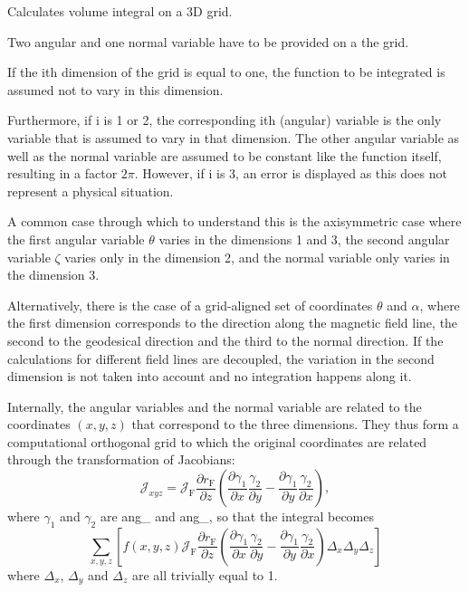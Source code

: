 Calculates volume integral on a 3D grid. 

Two angular and one normal variable have to be provided on a the grid.

If the {\ttfamily i}\textquotesingle{}th dimension of the grid is equal to one, the function to be integrated is assumed not to vary in this dimension.

Furthermore, if {\ttfamily i} is 1 or 2, the corresponding {\ttfamily i}\textquotesingle{}th (angular) variable is the only variable that is assumed to vary in that dimension. The other angular variable as well as the normal variable are assumed to be constant like the function itself, resulting in a factor $2 \pi$. However, if {\ttfamily i} is 3, an error is displayed as this does not represent a physical situation.

A common case through which to understand this is the axisymmetric case where the first angular variable $\theta$ varies in the dimensions 1 and 3, the second angular variable $\zeta$ varies only in the dimension 2, and the normal variable only varies in the dimension 3.

Alternatively, there is the case of a grid-\/aligned set of coordinates $\theta$ and $\alpha$, where the first dimension corresponds to the direction along the magnetic field line, the second to the geodesical direction and the third to the normal direction. If the calculations for different field lines are decoupled, the variation in the second dimension is not taken into account and no integration happens along it.

Internally, the angular variables and the normal variable are related to the coordinates $\left(x,y,z\right)$ that correspond to the three dimensions. They thus form a computational orthogonal grid to which the original coordinates are related through the transformation of Jacobians\+: \[\mathcal{J}_{xyz} = \mathcal{J}_\text{F} \frac{\partial r_\text{F}}{\partial z} \left(\frac{\partial \gamma_1}{\partial x} \frac{\gamma_2}{\partial y}- \frac{\partial \gamma_1}{\partial y} \frac{\gamma_2}{\partial x}\right) , \] where $\gamma_1$ and $\gamma_2$ are {\ttfamily ang\+\_} and {\ttfamily ang\+\_}, so that the integral becomes \[ \sum_{x,y,z} \left[ f\left(x,y,z\right) \mathcal{J}_\text{F} \frac{\partial r_\text{F}}{\partial z} \left(\frac{\partial \gamma_1}{\partial x} \frac{\gamma_2}{\partial y}- \frac{\partial \gamma_1}{\partial y} \frac{\gamma_2}{\partial x}\right) \Delta_x \Delta_y \Delta_z \right] \] where $\Delta_x$, $\Delta_y$ and $\Delta_z$ are all trivially equal to 1.

